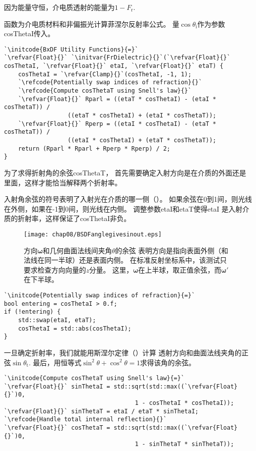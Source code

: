 因为能量守恒，介电质透射的能量为$1-F_{\mathrm{r}}$.

函数为介电质材料和非偏振光计算菲涅尔反射率公式。
量$\cos\theta_{\mathrm{i}}$作为参数{\ttfamily cosThetaI}传入。
\begin{lstlisting}
`\initcode{BxDF Utility Functions}{=}`
`\refvar{Float}{}` `\initvar{FrDielectric}{}`(`\refvar{Float}{}` cosThetaI, `\refvar{Float}{}` etaI, `\refvar{Float}{}` etaT) {
    cosThetaI = `\refvar{Clamp}{}`(cosThetaI, -1, 1);
    `\refcode{Potentially swap indices of refraction}{}`
    `\refcode{Compute cosThetaT using Snell's law}{}`
    `\refvar{Float}{}` Rparl = ((etaT * cosThetaI) - (etaI * cosThetaT)) /
                  ((etaT * cosThetaI) + (etaI * cosThetaT));
    `\refvar{Float}{}` Rperp = ((etaI * cosThetaI) - (etaT * cosThetaT)) /
                  ((etaI * cosThetaI) + (etaT * cosThetaT));
    return (Rparl * Rparl + Rperp * Rperp) / 2;
}
\end{lstlisting}

为了求得折射角的余弦{\ttfamily cosThetaT}，
首先需要确定入射方向是在介质的外面还是里面，这样才能恰当解释两个折射率。

入射角余弦的符号表明了入射光在介质的哪一侧（）。
如果余弦在0到1间，则光线在外侧，如果在-1到0间，则光线在内侧。
调整参数{\ttfamily etaI}和{\ttfamily etaT}使得{\ttfamily etaI}
是入射介质的折射率，这样保证了{\ttfamily cosThetaI}非负。

\begin{figure}[htbp]
    \centering
    \texttt{[image: chap08/BSDFanglegivesinout.eps]}
    \caption{方向$\bm\omega$和几何曲面法线间夹角$\theta$的余弦
        表明方向是指向表面外侧（和法线在同一半球）还是表面内侧。
        在标准反射坐标系中，该测试只要求检查方向向量的$z$分量。
        这里，$\bm\omega$在上半球，取正值余弦，而${\bm\omega}'$在下半球。}
    \label{fig:8.5}
\end{figure}

\begin{lstlisting}
`\initcode{Potentially swap indices of refraction}{=}`
bool entering = cosThetaI > 0.f;
if (!entering) {
    std::swap(etaI, etaT);
    cosThetaI = std::abs(cosThetaI);
}
\end{lstlisting}

一旦确定折射率，我们就能用斯涅尔定律（）计算
透射方向和曲面法线夹角的正弦$\sin\theta_{\mathrm{t}}$.
最后，用恒等式$\sin^2\theta+\cos^2\theta=1$求得该角的余弦。
\begin{lstlisting}
`\initcode{Compute cosThetaT using Snell's law}{=}`
`\refvar{Float}{}` sinThetaI = std::sqrt(std::max((`\refvar{Float}{}`)0,
                                     1 - cosThetaI * cosThetaI));
`\refvar{Float}{}` sinThetaT = etaI / etaT * sinThetaI;
`\refcode{Handle total internal reflection}{}`
`\refvar{Float}{}` cosThetaT = std::sqrt(std::max((`\refvar{Float}{}`)0,
                                     1 - sinThetaT * sinThetaT));
\end{lstlisting}

